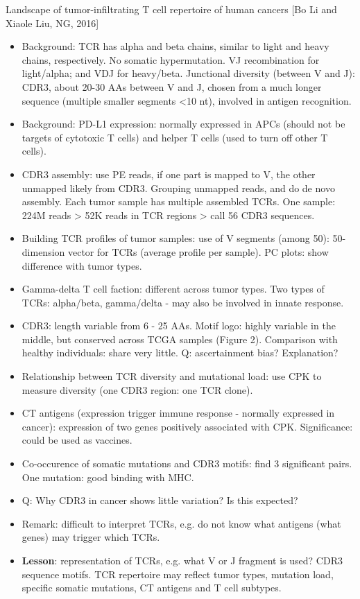 \documentclass{report}
\begin{document}
Landscape of tumor-infiltrating T cell repertoire of human cancers [Bo Li and Xiaole Liu, NG, 2016]
\begin{itemize}
	\item Background: TCR has alpha and beta chains, similar to light and heavy chains, respectively. No somatic hypermutation. VJ recombination for light/alpha; and VDJ for heavy/beta. Junctional diversity (between V and J): CDR3, about 20-30 AAs between V and J, chosen from a much longer sequence (multiple smaller segments <10 nt), involved in antigen recognition.
	
	\item Background: PD-L1 expression: normally expressed in APCs (should not be targets of cytotoxic T cells) and helper T cells (used to turn off other T cells).
	
	\item CDR3 assembly: use PE reads, if one part is mapped to V, the other unmapped likely from CDR3. Grouping unmapped reads, and do de novo assembly. Each tumor sample has multiple assembled TCRs. One sample: 224M reads > 52K reads in TCR regions > call 56 CDR3 sequences.
	
	\item Building TCR profiles of tumor samples: use of V segments (among 50): 50-dimension vector for TCRs (average profile per sample). PC plots: show difference with tumor types.
	
	\item Gamma-delta T cell faction: different across tumor types. Two types of TCRs: alpha/beta, gamma/delta - may also be involved in innate response.
	
	\item CDR3: length variable from 6 - 25 AAs. Motif logo: highly variable in the middle, but conserved across TCGA samples (Figure 2). Comparison with healthy individuals: share very little. Q: ascertainment bias? Explanation?
	
	\item Relationship between TCR diversity and mutational load: use CPK to measure diversity (one CDR3 region: one TCR clone).
	
	\item CT antigens (expression trigger immune response - normally expressed in cancer): expression of two genes positively associated with CPK. Significance: could be used as vaccines.
	
	\item Co-occurence of somatic mutations and CDR3 motifs: find 3 significant pairs. One mutation: good binding with MHC.
	
	\item Q: Why CDR3 in cancer shows little variation? Is this expected?
	
	\item Remark: difficult to interpret TCRs, e.g. do not know what antigens (what genes) may trigger which TCRs.
	
	\item \textbf{Lesson}: representation of TCRs, e.g. what V or J fragment is used? CDR3 sequence motifs. TCR repertoire may reflect tumor types, mutation load, specific somatic mutations, CT antigens and T cell subtypes.
\end{itemize}
\end{document}
